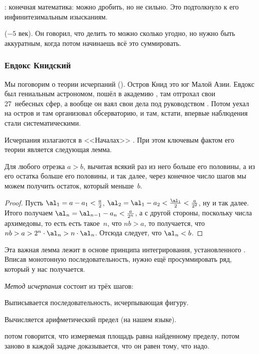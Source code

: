 \documentclass[a4paper,oneside,fleqn,10pt]{article}
\begin{document}
: конечная математика: можно дробить, но не сильно. Это подтолкнуло 
к его инфинитезимальным изысканиям.

 ($-5$ век). Он говорил, что делить то можно сколько угодно, но нужно быть аккуратным,
когда потом начинаешь всё это суммировать.

\subsubsection{Евдокс Книдский}

Мы поговорим о теории исчерпаний  ().
Остров Книд это юг Малой Азии.
Евдокс был гениальным астрономом, пошёл в академию , там отгрохал свои 27~небесных сфер,
а вообще он ваял свои дела под руководством .
Потом уехал на остров и там организовал обсерваторию, и там, кстати, впервые
наблюдения стали систематическими.

Исчерпания излагаются в <<Началах>> .
При этом ключевым фактом его теории является следующая
лемма.

\begin{lemma}
Для любого отрезка $a > b$, вычитая всякий раз из него больше его половины,
а из его остатка больше его половины, и так далее, через конечное число шагов
мы можем получить остаток, который меньше~$b$.
\end{lemma}
\begin{proof}
Пусть $\al_1 = a-a_1 < \frac{a}{2}$,
$\al_2 = \al_1 - a_2 < \frac{\al_1}{2} < \frac{a}{2^2}$,
ну и так далее. Итого получаем
$\al_n = \al_{n-1} - a_n < \frac{a}{2^n}$,
а с другой стороны, поскольку числа архимедовы, то есть есть такое~$n$,
что $nb > a$, то получается, что $nb > a > 2^n \cdot \al_n > n \cdot \al_n$.
Отсюда следует, что $\al_n < b$.
\end{proof}

Эта важная лемма лежит в основе принципа интегрирования, установленного .
Вписав монотонную последовательность, нужно ещё просуммировать ряд, который у нас получается.

\emph{Метод исчерпания} состоит из трёх шагов:

\begin{items}{-2}
\item Выписывается последовательность, исчерпывающая фигуру.
\item Вычисляется арифметический предел (на нашем языке).
\item потом говорится, что измеряемая площадь равна найденному пределу, потом
заново в каждой задаче доказывается, что он равен тому, что надо.
\end{items}
\end{document}
